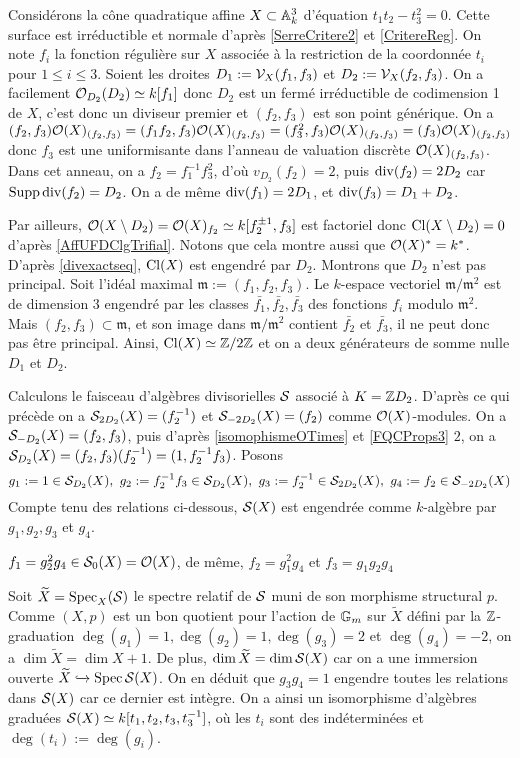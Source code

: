 \begin{ex}
Considérons la cône quadratique affine $X\subset \mathbb{A}_k^3$ d'équation $t_1t_2-t_3^2=0$. Cette surface est irréductible et normale d'après \ref{SerreCritere2} et \ref{CritereReg}. On note $f_i$ la fonction régulière sur $X$ associée à la restriction de la coordonnée $t_i$ pour $1\leq i\leq 3$. Soient les droites $D_1:=\mathcal{V}_X(f_1,f_3)$ et $D_2:=\mathcal{V}_X(f_2,f_3)$. On a facilement $\mathcal{O}_{D_2}(D_2)\simeq k[f_1]$ donc $D_2$ est un fermé irréductible de codimension 1 de $X$, c'est donc un diviseur premier et $(f_2,f_3)$ est son point générique. On a $(f_2,f_3)\mathcal{O}(X)_{(f_2,f_3)}=(f_1f_2,f_3)\mathcal{O}(X)_{(f_2,f_3)}=(f_3^2,f_3)\mathcal{O}(X)_{(f_2,f_3)}=(f_3)\mathcal{O}(X)_{(f_2,f_3)}$ donc $f_3$ est une uniformisante dans l'anneau de valuation discrète $\mathcal{O}(X)_{(f_2,f_3)}$. Dans cet anneau, on a $f_2=f_1^{-1}f_3^2$, d'où $v_{D_2}(f_2)=2$, puis $\operatorname{div}(f_2)=2D_2$ car $\operatorname{Supp} \operatorname{div}(f_2)=D_2$. On a de même $\operatorname{div}(f_1)=2D_1$, et $\operatorname{div}(f_3)=D_1+D_2$.

Par ailleurs, $\mathcal{O}(X\setminus D_2)=\mathcal{O}(X)_{f_2}\simeq k[f_2^{\pm 1},f_3]$ est factoriel donc $\operatorname{Cl}(X\setminus D_2)=0$ d'après \ref{AffUFDClgTrifial}. Notons que cela montre aussi que $\mathcal{O}(X)^*=k^*$. D'après \ref{divexactseq}, $\operatorname{Cl}(X)$ est engendré par $D_2$. Montrons que $D_2$ n'est pas principal. Soit l'idéal maximal $\mathfrak{m}:=(f_1,f_2,f_3)$. Le $k$-espace vectoriel $\mathfrak{m}/\mathfrak{m}^2$ est de dimension $3$ engendré par les classes $\bar{f_1},\bar{f_2},\bar{f_3}$ des fonctions $f_i$ modulo $\mathfrak{m}^2$. Mais $(f_2,f_3)\subset \mathfrak{m}$, et son image dans $\mathfrak{m}/\mathfrak{m}^2$ contient $\bar{f_2}$ et $\bar{f_3}$, il ne peut donc pas être principal. Ainsi, $\operatorname{Cl}(X)\simeq \mathbb{Z}/2\mathbb{Z}$ et on a deux générateurs de somme nulle $D_1$ et $D_2$.

Calculons le faisceau d'algèbres divisorielles $\mathcal{S}$ associé à $K=\mathbb{Z} D_2$. D'après ce qui précède on a $\mathcal{S}_{2D_2}(X)=(f_2^{-1})$ et $\mathcal{S}_{-2D_2}(X)=(f_2)$ comme $\mathcal{O}(X)$-modules. On a $\mathcal{S}_{-D_2}(X)=(f_2,f_3)$, puis d'après \ref{isomophismeOTimes} et \ref{FQCProps3} $2$, on a $\mathcal{S}_{D_2}(X)=(f_2,f_3)(f_2^{-1})=(1,f_2^{-1}f_3)$. Posons 
$$g_1:=1\in\mathcal{S}_{D_2}(X), \,\,g_2:=f_2^{-1}f_3\in\mathcal{S}_{D_2}(X),\,\,g_3:=f_2^{-1}\in \mathcal{S}_{2D_2}(X), \,\,g_4:=f_2\in\mathcal{S}_{-2D_2}(X)$$
Compte tenu des relations ci-dessous, $\mathcal{S}(X)$ est engendrée comme $k$-algèbre par $g_1,g_2,g_3$ et $g_4$.
\begin{center}
$f_1=g_2^2g_4\in\mathcal{S}_0(X)=\mathcal{O}(X)$, de même,  $f_2=g_1^2g_4$ et $f_3=g_1g_2g_4$
\end{center}
Soit $\widetilde{X}=\operatorname{Spec}_X(\mathcal{S})$ le spectre relatif de $\mathcal{S}$ muni de son morphisme structural $p$. Comme $(X,p)$ est un bon quotient pour l'action de $\mathbb{G}_m$ sur $\widetilde{X}$ défini par la $\mathbb{Z}$-graduation $\deg(g_1)=1,\deg(g_2)=1,\deg(g_3)=2$ et $\deg(g_4)=-2$, on a $\dim \widetilde{X}=\dim X+ 1$. De plus, $\dim \widetilde{X}=\dim \mathcal{S}(X)$ car on a une immersion ouverte $\widetilde{X}\xhookrightarrow{} \operatorname{Spec} \mathcal{S}(X)$. On en déduit que $g_3g_4=1$ engendre toutes les relations dans $\mathcal{S}(X)$ car ce dernier est intègre. On a ainsi un isomorphisme d'algèbres graduées $\mathcal{S}(X)\simeq k[t_1,t_2,t_3, t_3^{-1}]$, où les $t_i$ sont des indéterminées et $\deg(t_i):=\deg(g_i)$.


\end{ex}
